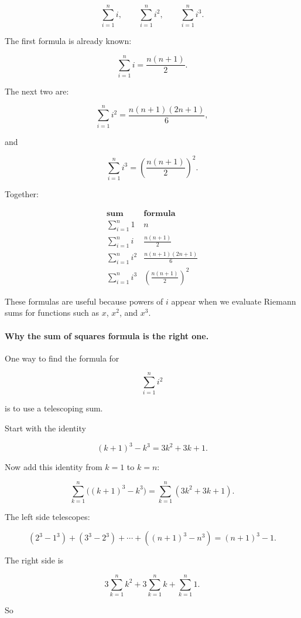 \[
\sum_{i=1}^{n} i,
\qquad
\sum_{i=1}^{n} i^2,
\qquad
\sum_{i=1}^{n} i^3.
\]

The first formula is already known:

\[
\sum_{i=1}^{n} i=\frac{n(n+1)}{2}.
\]

The next two are:

\[
\boxed{
\sum_{i=1}^{n} i^2
=
\frac{n(n+1)(2n+1)}{6},
}
\]

and

\[
\boxed{
\sum_{i=1}^{n} i^3
=
\left(\frac{n(n+1)}{2}\right)^2.
}
\]

Together:

\[
\begin{array}{c|c}
\textbf{sum} & \textbf{formula} \\ \hline
\displaystyle \sum_{i=1}^{n} 1 & n \\[8pt]
\displaystyle \sum_{i=1}^{n} i & \displaystyle \frac{n(n+1)}{2} \\[10pt]
\displaystyle \sum_{i=1}^{n} i^2 & \displaystyle \frac{n(n+1)(2n+1)}{6} \\[10pt]
\displaystyle \sum_{i=1}^{n} i^3 & \displaystyle \left(\frac{n(n+1)}{2}\right)^2
\end{array}
\]

These formulas are useful because powers of \(i\) appear when we evaluate Riemann
sums for functions such as \(x\), \(x^2\), and \(x^3\).

\paragraph{Why the sum of squares formula is the right one.}
One way to find the formula for

\[
\sum_{i=1}^{n} i^2
\]

is to use a telescoping sum.

Start with the identity

\[
(k+1)^3-k^3=3k^2+3k+1.
\]

Now add this identity from \(k=1\) to \(k=n\):

\[
\sum_{k=1}^{n}\bigl((k+1)^3-k^3\bigr)
=
\sum_{k=1}^{n}(3k^2+3k+1).
\]

The left side telescopes:

\[
(2^3-1^3)+(3^3-2^3)+\cdots+((n+1)^3-n^3)
=
(n+1)^3-1.
\]

The right side is

\[
3\sum_{k=1}^{n}k^2
+
3\sum_{k=1}^{n}k
+
\sum_{k=1}^{n}1.
\]

So

